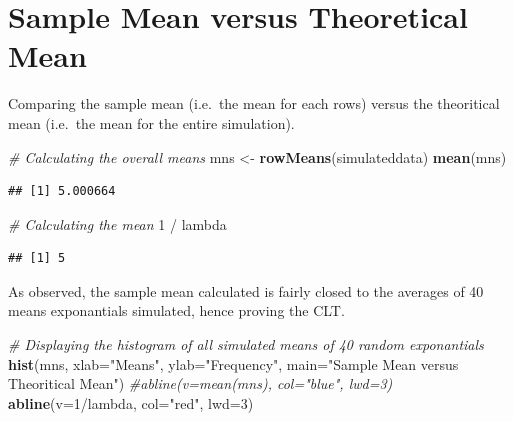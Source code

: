 \documentclass[]{article}
\newenvironment{Shaded}{\begin{snugshade}}{\end{snugshade}}
\newcommand{\KeywordTok}[1]{\textcolor[rgb]{0.13,0.29,0.53}{\textbf{{#1}}}}
\newcommand{\DataTypeTok}[1]{\textcolor[rgb]{0.13,0.29,0.53}{{#1}}}
\newcommand{\DecValTok}[1]{\textcolor[rgb]{0.00,0.00,0.81}{{#1}}}
\newcommand{\StringTok}[1]{\textcolor[rgb]{0.31,0.60,0.02}{{#1}}}
\newcommand{\CommentTok}[1]{\textcolor[rgb]{0.56,0.35,0.01}{\textit{{#1}}}}
\newcommand{\NormalTok}[1]{{#1}}
\begin{document}
\section{Sample Mean versus Theoretical
Mean}\label{sample-mean-versus-theoretical-mean}

Comparing the sample mean (i.e.~the mean for each rows) versus the
theoritical mean (i.e.~the mean for the entire simulation).

\begin{Shaded}
\begin{Highlighting}[]
\CommentTok{# Calculating the overall means}
\NormalTok{mns <-}\StringTok{ }\KeywordTok{rowMeans}\NormalTok{(simulateddata)}
\KeywordTok{mean}\NormalTok{(mns)}
\end{Highlighting}
\end{Shaded}

\begin{verbatim}
## [1] 5.000664
\end{verbatim}

\begin{Shaded}
\begin{Highlighting}[]
\CommentTok{# Calculating the mean}
\DecValTok{1} \NormalTok{/}\StringTok{ }\NormalTok{lambda}
\end{Highlighting}
\end{Shaded}

\begin{verbatim}
## [1] 5
\end{verbatim}

As observed, the sample mean calculated is fairly closed to the averages
of 40 means exponantials simulated, hence proving the CLT.

\begin{Shaded}
\begin{Highlighting}[]
\CommentTok{# Displaying the histogram of all simulated means of 40 random exponantials}
\KeywordTok{hist}\NormalTok{(mns, }\DataTypeTok{xlab=}\StringTok{"Means"}\NormalTok{, }\DataTypeTok{ylab=}\StringTok{"Frequency"}\NormalTok{, }\DataTypeTok{main=}\StringTok{"Sample Mean versus Theoritical Mean"}\NormalTok{)}
\CommentTok{#abline(v=mean(mns), col="blue", lwd=3)}
\KeywordTok{abline}\NormalTok{(}\DataTypeTok{v=}\DecValTok{1}\NormalTok{/lambda, }\DataTypeTok{col=}\StringTok{"red"}\NormalTok{, }\DataTypeTok{lwd=}\DecValTok{3}\NormalTok{)}
\end{Highlighting}
\end{Shaded}
\end{document}
